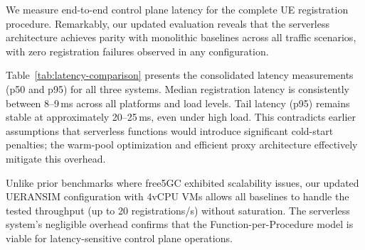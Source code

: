 \documentclass[conference]{IEEEtran}
\begin{document}
We measure end-to-end control plane latency for the complete UE registration procedure. Remarkably, our updated evaluation reveals that the serverless architecture achieves parity with monolithic baselines across all traffic scenarios, with zero registration failures observed in any configuration.

Table~\ref{tab:latency-comparison} presents the consolidated latency measurements (p50 and p95) for all three systems. Median registration latency is consistently between 8--9\,ms across all platforms and load levels. Tail latency (p95) remains stable at approximately 20--25\,ms, even under high load. This contradicts earlier assumptions that serverless functions would introduce significant cold-start penalties; the warm-pool optimization and efficient proxy architecture effectively mitigate this overhead.

\begin{table}[t]
\centering
\caption{Control Plane Latency Comparison (ms)}
\label{tab:latency-comparison}
\footnotesize
{}
\end{table}

Unlike prior benchmarks where free5GC exhibited scalability issues, our updated UERANSIM configuration with 4vCPU VMs allows all baselines to handle the tested throughput (up to 20 registrations/s) without saturation. The serverless system's negligible overhead confirms that the Function-per-Procedure model is viable for latency-sensitive control plane operations.
\end{document}
